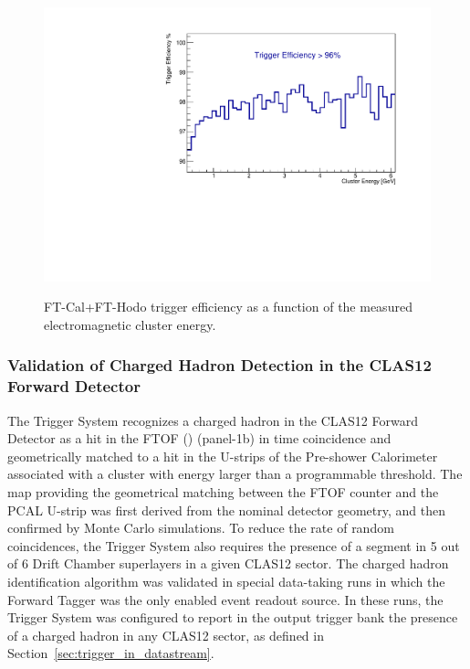 \begin{figure}[!htb]
 \centering
{\includegraphics[width=.5\textwidth]{img/FT_ClusterEfficiencyHODO.pdf}}
 \caption{FT-Cal+FT-Hodo trigger efficiency as a function of the measured electromagnetic cluster energy.}
 \label{fig:FT_ClusterEfficiencyHODO}
\end{figure}

\subsubsection{Validation of Charged Hadron Detection in the CLAS12 Forward Detector}
\label{valid_hadron_forward_detector}

The Trigger System recognizes a charged hadron in the CLAS12 Forward Detector as a hit in the FTOF
(\cite{ftof-ref}) (panel-1b) in time coincidence and geometrically matched to a hit in the U-strips of the
Pre-shower Calorimeter~\cite{ec-ref} associated with a cluster with energy larger than a programmable
threshold. The map providing the geometrical matching between the FTOF counter and the PCAL U-strip
was first derived from the nominal detector geometry, and then confirmed by Monte Carlo simulations. To
reduce the rate of random coincidences, the Trigger System also requires the presence of a segment in 5 out
of 6 Drift Chamber superlayers in a given CLAS12 sector. The charged hadron identification algorithm was
validated in special data-taking runs in which the Forward Tagger was the only enabled event readout source.
In these runs, the Trigger System was configured to report in the output trigger bank the presence of a
charged hadron in any CLAS12 sector, as defined in Section~\ref{sec:trigger_in_datastream}. 

